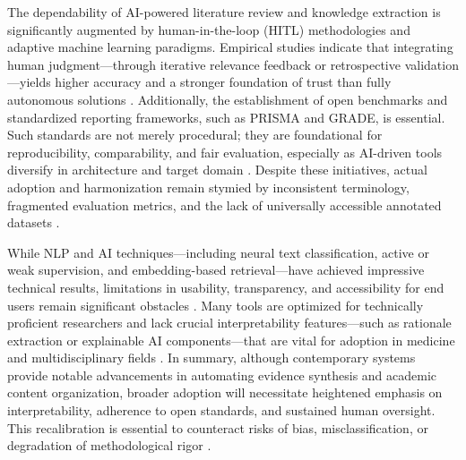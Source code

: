 The dependability of AI-powered literature review and knowledge extraction is significantly augmented by human-in-the-loop (HITL) methodologies and adaptive machine learning paradigms. Empirical studies indicate that integrating human judgment—through iterative relevance feedback or retrospective validation—yields higher accuracy and a stronger foundation of trust than fully autonomous solutions \cite{ref80,ref86,ref88,ref89,ref91,ref94,ref98,ref108}. Additionally, the establishment of open benchmarks and standardized reporting frameworks, such as PRISMA and GRADE, is essential. Such standards are not merely procedural; they are foundational for reproducibility, comparability, and fair evaluation, especially as AI-driven tools diversify in architecture and target domain \cite{ref34,ref78,ref80,ref102,ref104}. Despite these initiatives, actual adoption and harmonization remain stymied by inconsistent terminology, fragmented evaluation metrics, and the lack of universally accessible annotated datasets \cite{ref86,ref80,ref98,ref104}.

While NLP and AI techniques—including neural text classification, active or weak supervision, and embedding-based retrieval—have achieved impressive technical results, limitations in usability, transparency, and accessibility for end users remain significant obstacles \cite{ref46,ref38,ref49,ref51,ref86,ref108}. Many tools are optimized for technically proficient researchers and lack crucial interpretability features—such as rationale extraction or explainable AI components—that are vital for adoption in medicine and multidisciplinary fields \cite{ref47,ref49,ref94,ref96}. In summary, although contemporary systems provide notable advancements in automating evidence synthesis and academic content organization, broader adoption will necessitate heightened emphasis on interpretability, adherence to open standards, and sustained human oversight. This recalibration is essential to counteract risks of bias, misclassification, or degradation of methodological rigor \cite{ref35,ref38,ref46,ref51,ref94,ref98,ref102,ref111}.

